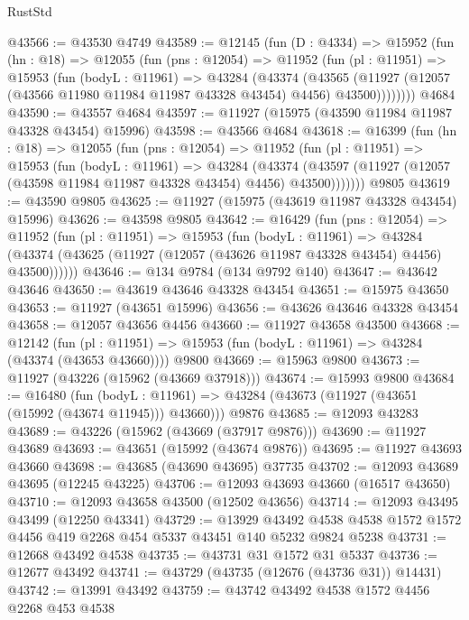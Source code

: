 \begin{lexlean}{RustStd}
\begin{coremodule}
@43566 := @43530 @4749
@43589 := @12145
    (fun (D : @4334) =>
    @15952
      (fun (hn : @18) =>
      @12055
        (fun (pns : @12054) =>
        @11952
          (fun (pl : @11951) =>
          @15953
            (fun (bodyL : @11961) =>
            @43284
              (@43374
                (@43565
                  (@11927 (@12057 (@43566 @11980 @11984 @11987 @43328 @43454) @4456) @43500))))))))
    @4684
@43590 := @43557 @4684
@43597 := @11927 (@15975 (@43590 @11984 @11987 @43328 @43454) @15996)
@43598 := @43566 @4684
@43618 := @16399
    (fun (hn : @18) =>
    @12055
      (fun (pns : @12054) =>
      @11952
        (fun (pl : @11951) =>
        @15953
          (fun (bodyL : @11961) =>
          @43284
            (@43374
              (@43597 (@11927 (@12057 (@43598 @11984 @11987 @43328 @43454) @4456) @43500)))))))
    @9805
@43619 := @43590 @9805
@43625 := @11927 (@15975 (@43619 @11987 @43328 @43454) @15996)
@43626 := @43598 @9805
@43642 := @16429
    (fun (pns : @12054) =>
    @11952
      (fun (pl : @11951) =>
      @15953
        (fun (bodyL : @11961) =>
        @43284 (@43374 (@43625 (@11927 (@12057 (@43626 @11987 @43328 @43454) @4456) @43500))))))
@43646 := @134 @9784 (@134 @9792 @140)
@43647 := @43642 @43646
@43650 := @43619 @43646 @43328 @43454
@43651 := @15975 @43650
@43653 := @11927 (@43651 @15996)
@43656 := @43626 @43646 @43328 @43454
@43658 := @12057 @43656 @4456
@43660 := @11927 @43658 @43500
@43668 := @12142
    (fun (pl : @11951) => @15953 (fun (bodyL : @11961) => @43284 (@43374 (@43653 @43660))))
    @9800
@43669 := @15963 @9800
@43673 := @11927 (@43226 (@15962 (@43669 @37918)))
@43674 := @15993 @9800
@43684 := @16480
    (fun (bodyL : @11961) => @43284 (@43673 (@11927 (@43651 (@15992 (@43674 @11945))) @43660)))
    @9876
@43685 := @12093 @43283
@43689 := @43226 (@15962 (@43669 (@37917 @9876)))
@43690 := @11927 @43689
@43693 := @43651 (@15992 (@43674 @9876))
@43695 := @11927 @43693 @43660
@43698 := @43685 (@43690 @43695) @37735
@43702 := @12093 @43689 @43695 (@12245 @43225)
@43706 := @12093 @43693 @43660 (@16517 @43650)
@43710 := @12093 @43658 @43500 (@12502 @43656)
@43714 := @12093 @43495 @43499 (@12250 @43341)
@43729 := @13929
    @43492
    @4538
    @4538
    @1572
    @1572
    @4456
    @419
    @2268
    @454
    @5337
    @43451
    @140
    @5232
    @9824
    @5238
@43731 := @12668 @43492 @4538
@43735 := @43731 @31 @1572 @31 @5337
@43736 := @12677 @43492
@43741 := @43729 (@43735 (@12676 (@43736 @31)) @14431)
@43742 := @13991 @43492
@43759 := @43742
    @43492
    @4538
    @1572
    @4456
    @2268
    @453
    @4538

\end{coremodule}
\end{lexlean}
